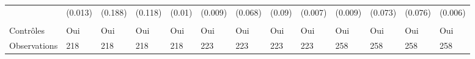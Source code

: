 \documentclass[
]{book}
\begin{document}
\begin{landscape}
\begin{ThreePartTable}
\begin{longtable}[t]{lllllllllllll}
\hspace{1em} & (0.013) & (0.188) & (0.118) & (0.01) & (0.009) & (0.068) & (0.09) & (0.007) & (0.009) & (0.073) & (0.076) & (0.006)\\
\hspace{1em} &  &  &  &  &  &  &  &  &  &  &  & \\
\hspace{1em}Contrôles & Oui & Oui & Oui & Oui & Oui & Oui & Oui & Oui & Oui & Oui & Oui & Oui\\
\hspace{1em}Observations & 218 & 218 & 218 & 218 & 223 & 223 & 223 & 223 & 258 & 258 & 258 & 258\\*
\end{longtable}
\end{ThreePartTable}
\endgroup{}
\end{landscape}
\end{document}
